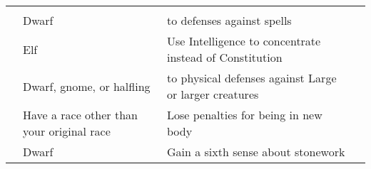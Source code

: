 {\begin{longtabu}{>{\lcol}p{10em} >{\lcol}p{15em} >{\lcol}X >{\lcol}p{3em}}
        \midrule
         &  &  &  \\
         & Dwarf &  to defenses against spells &  \\
         & Elf & Use Intelligence to concentrate instead of Constitution &  \\
         & Dwarf, gnome, or halfling &  to physical defenses against Large or larger creatures &  \\
         & Have a race other than your original race & Lose penalties for being in new body &  \\
         & Dwarf & Gain a sixth sense about stonework &  \\


\end{longtabu}}
